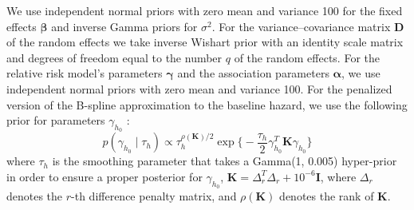 We use independent normal priors with zero mean and variance 100 for the fixed effects $\boldsymbol{\beta}$ and inverse Gamma priors for $\sigma^2$. For the variance–covariance matrix $\boldsymbol{D}$ of the random effects we take inverse Wishart prior with an identity scale matrix and degrees of freedom equal to the number $q$ of the random effects. For the relative risk model's parameters $\boldsymbol{\gamma}$ and the association parameters $\boldsymbol{\alpha}$, we use independent normal priors with zero mean and variance 100. For the penalized version of the B-spline approximation to the baseline hazard, we use the following prior for parameters $\gamma_{h_0}$ \citep{lang2004bayesian}:
\begin{equation*}
p(\gamma_{h_0} \mid \tau_h) \propto \tau_h^{\rho(\boldsymbol{K})/2} \exp\bigg\{-\frac{\tau_h}{2}\gamma_{h_0}^T \boldsymbol{K} \gamma_{h_0}\bigg\}
\end{equation*}
where $\tau_h$ is the smoothing parameter that takes a Gamma(1, 0.005) hyper-prior in order to ensure a proper posterior for $\gamma_{h_0}$, $\boldsymbol{K} = \Delta_r^T \Delta_r + 10^{-6} \boldsymbol{I}$, where $\Delta_r$ denotes the $r$-th difference penalty matrix, and $\rho(\boldsymbol{K})$ denotes the rank of $\boldsymbol{K}$.